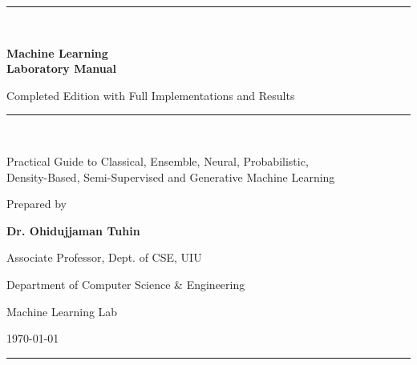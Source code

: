 \documentclass[11pt,a4paper]{report}
\begin{document}
\begin{titlepage}
    \centering
    \vspace*{1.2cm}
    {\color{mlblue}\rule{\textwidth}{1.2pt}}\\[6mm]
    {\Huge\bfseries\color{mlblue} Machine Learning\\[2mm] Laboratory Manual\par}
    \vspace{5mm}
    {\Large Completed Edition with Full Implementations and Results\par}
    \vspace{4mm}
    {\color{mlblue}\rule{\textwidth}{0.6pt}}\\[8mm]
    {\large Practical Guide to Classical, Ensemble, Neural, Probabilistic,\\[1mm]
    Density-Based, Semi-Supervised and Generative Machine Learning\par}
    \vfill
    {\large Prepared by\par}
    \vspace{2mm}
    {\Large\bfseries Dr. Ohidujjaman Tuhin\par}
    {\large Associate Professor, Dept. of CSE, UIU\par}
    \vspace{8mm}
    {\large Department of Computer Science \& Engineering\par}
    {\large Machine Learning Lab\par}
    \vfill
    {\large \today\par}
    \vspace{4mm}
    {\color{mlblue}\rule{\textwidth}{1.2pt}}
\end{titlepage}

\clearpage
\setcounter{tocdepth}{0}   %
\tableofcontents

\clearpage
\end{document}
